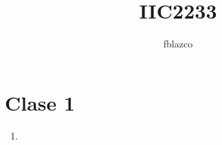 \documentclass{article}
\author{fblazco}
\title{IIC2233}
\begin{document}
	\maketitle
    \section{Clase 1}
    \begin{enumerate}
        \item 
    \end{enumerate}    
          
        
\end{document}
